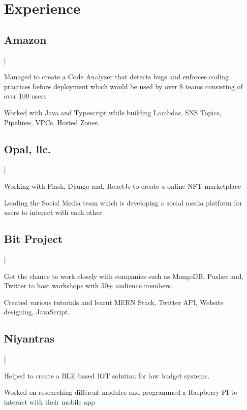 \documentclass[]{deedy-resume-openfont}
\begin{document}
\begin{minipage}[t]{1\textwidth}
\section{Experience}

\subsection*{Amazon}
\medspace|\medspace
{}
\vspace{\topsep}
\begin{tightemize}
\item Managed to create a Code Analyzer that detects bugs and enforces coding practices before deployment which would be used by over 8 teams consisting of over 100 users
\item Worked with Java and Typescript while building Lambdas, SNS Topics, Pipelines, VPCs, Hosted Zones.
\end{tightemize}
\sectionsep

\subsection*{Opal, llc.}
\medspace|\medspace
{}
\vspace{\topsep}
\begin{tightemize}
\item Working with Flask, Django and, ReactJs to create a online NFT marketplace
\item Leading the Social Media team which is developing a social media platform for users to interact with each other 
\end{tightemize}
\sectionsep

\subsection*{Bit Project}
\medspace|\medspace
{}
\begin{tightemize}
\item Got the chance to work closely with companies such as MongoDB, Pusher and, Twitter to host workshops with 50+ audience members.
\item Created various tutorials and learnt MERN Stack, Twitter API, Website designing, JavaScript.
\end{tightemize}
\sectionsep

\subsection*{Niyantras}
\medspace|\medspace
{}
\begin{tightemize}
\item Helped to create a BLE based IOT solution for low budget systems.
\item Worked on researching different modules and programmed a Raspberry PI to interact with their mobile app 
\end{tightemize}
\end{minipage}
\end{document}
